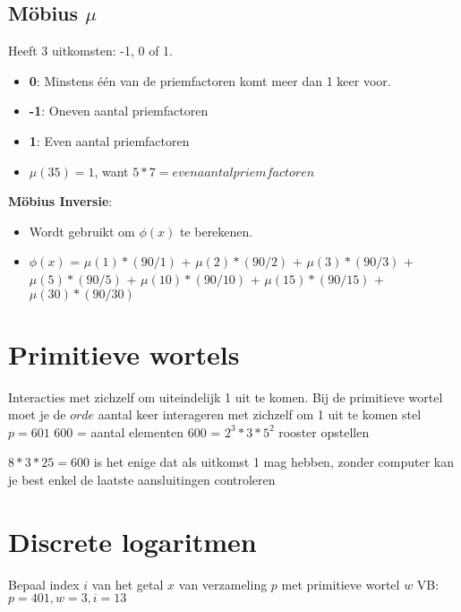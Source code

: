 \documentclass[12pt]{report}
\newcommand{\todo}[1] {
\color{red}\textunderscore{\textit{TODO: #1}}
\color{black}
}
\newcommand{\important}[1] {\textbf{\color{orange}#1}}
\begin{document}
\subsection{Möbius $\mu$}
Heeft 3 uitkomsten: -1, 0 of 1.
\begin{itemize}
 \item \important{0}: Minstens één van de priemfactoren komt meer dan 1 keer voor.
 \item \important{-1}: Oneven aantal priemfactoren
 \item \important{1}: Even aantal priemfactoren
 \item $\mu(35) = 1 $, want $ 5 * 7 = even aantal priemfactoren$
\end{itemize}
 
\important{Möbius Inversie}:
\begin{itemize}
 \item Wordt gebruikt om $\phi(x)$ te berekenen.
 \item $\phi(x)$ = $\mu(1) * (90/1)$ 
  \newline +  $\mu(2) * (90/2)$
  \newline +  $\mu(3) * (90/3)$
  \newline +  $\mu(5) * (90/5)$
  \newline +  $\mu(10) * (90/10)$
  \newline +  $\mu(15) * (90/15)$
  \newline +  $\mu(30) * (90/30)$
\end{itemize}

\section{Primitieve wortels}
Interacties met zichzelf om uiteindelijk 1 uit te komen. 
Bij de primitieve wortel moet je de $orde$ aantal keer interageren
met zichzelf om 1 uit te komen
\newline
stel $p = 601$
600 = aantal elementen 
600 = $2^3 * 3 * 5^2$
\newline
rooster opstellen \todo{rooster}
$8 * 3 * 25 = 600$ is het enige dat als uitkomst 1 mag hebben,
zonder computer kan je best enkel de laatste aansluitingen controleren

\section{Discrete logaritmen}
Bepaal index $i$ van het getal $x$ van verzameling $p$ met primitieve wortel $w$
\newline
VB: $p = 401, w=3, i=13$
\end{document}
